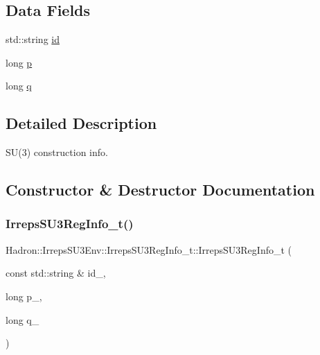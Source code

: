 \subsection*{Data Fields}
\begin{DoxyCompactItemize}
\item 
std\+::string \mbox{\hyperlink{structHadron_1_1IrrepsSU3Env_1_1IrrepsSU3RegInfo__t_a70e0f962edb35da73bed617ac0fddd81}{id}}
\item 
long \mbox{\hyperlink{structHadron_1_1IrrepsSU3Env_1_1IrrepsSU3RegInfo__t_a5ce27a63cc496fb09569691b1efdf0d0}{p}}
\item 
long \mbox{\hyperlink{structHadron_1_1IrrepsSU3Env_1_1IrrepsSU3RegInfo__t_a97db0daa2cc5a119261d02424f4979b6}{q}}
\end{DoxyCompactItemize}


\subsection{Detailed Description}
S\+U(3) construction info. 

\subsection{Constructor \& Destructor Documentation}
\mbox{\label{structHadron_1_1IrrepsSU3Env_1_1IrrepsSU3RegInfo__t_ad3e33486ad0d29745aea8a67a190d58c}} 
\subsubsection{\texorpdfstring{IrrepsSU3RegInfo\_t()}{IrrepsSU3RegInfo\_t()}\hspace{0.1cm}{\footnotesize\ttfamily [1/3]}}
{\footnotesize\ttfamily Hadron\+::\+Irreps\+S\+U3\+Env\+::\+Irreps\+S\+U3\+Reg\+Info\+\_\+t\+::\+Irreps\+S\+U3\+Reg\+Info\+\_\+t (\begin{DoxyParamCaption}\item[{const std\+::string \&}]{id\+\_\+,  }\item[{long}]{p\+\_\+,  }\item[{long}]{q\+\_\+ }\end{DoxyParamCaption})\hspace{0.3cm}{\ttfamily [inline]}}

